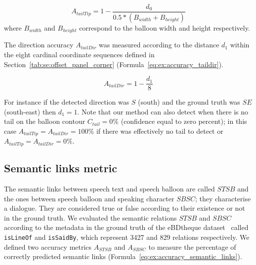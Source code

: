 \begin{equation}
\label{eq:ex:accuracy_tailtip}
  A_{tailTip} = 1 - \frac{d_0}{0.5 * (B_{width} + B_{height})}
\end{equation}
where $B_{width}$ and $B_{height}$ correspond to the balloon width and height respectively.

The direction accuracy $A_{tailDir}$ was measured according to the distance $d_1$ within the eight cardinal coordinate sequences defined in Section~\ref{tab:se:offset_panel_corner} (Formula~\ref{eq:ex:accuracy_taildir}).

\begin{equation}
\label{eq:ex:accuracy_taildir}
  A_{tailDir} = 1- \frac{d_1}{8}
\end{equation}

For instance if the detected direction was $S$ (south) and the ground truth was $SE$ (south-east) then $d_1=1$.
Note that our method can also detect when there is no tail on the balloon contour $C_{tail}=0\%$ (confidence equal to zero percent); in this case $A_{tailTip}=A_{tailDir}=100\%$ if there was effectively no tail to detect or $A_{tailTip}=A_{tailDir}=0\%$.


\subsection{Semantic links metric} %
\label{sub:ex:semantic_links_metric}

The semantic links between speech text and speech balloon are called $STSB$ and the ones between speech balloon and speaking character $SBSC$; they characterise a dialogue.
They are considered true or false according to their existence or not in the ground truth.
We evaluated the semantic relations $STSB$ and $SBSC$ according to the metadata in the ground truth of the eBDtheque dataset~\cite{Guerin2013} called \texttt{{isLineOf}} and \texttt{{isSaidBy}}, which represent 3427 and 829 relations respectively.
We defined two accuracy metrics $A_{STSB}$ and $A_{SBSC}$ to measure the percentage of correctly predicted semantic links (Formula~\ref{eq:ex:accuracy_semantic_links}).

